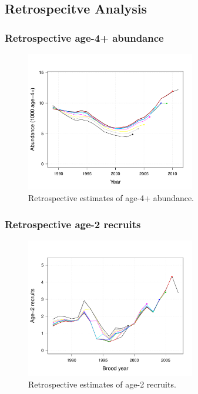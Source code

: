 \documentclass{beamer}
\begin{document}
\subsection[Retrospective]{Retrospecitve Analysis} %
\label{sub:retrospecitve_analysis}
\begin{frame}[t]\frametitle{Retrospective age-4+ abundance}
	\begin{figure}[htbp]
		\centering
			\includegraphics[height=2.4in]{../../FIGS/ASMR/fig:retro_nt4.pdf}
		\caption{Retrospective estimates of age-4+ abundance.}
		\label{fig:FIGS_ASMR_fig:retro_nt4}
	\end{figure}
\end{frame}
%
\begin{frame}[t]\frametitle{Retrospective age-2 recruits}
	\begin{figure}[htbp]
		\centering
			\includegraphics[height=2.4in]{../../FIGS/ASMR/fig:retro_rt.pdf}
		\caption{Retrospective estimates of age-2 recruits.}
		\label{fig:FIGS_ASMR_fig:retro_rt}
	\end{figure}
	
\end{frame}
%
\end{document}

